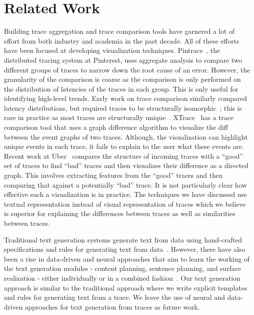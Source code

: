 \section{Related Work}
\label{sec:related}

Building trace aggregation and trace comparison tools have garnered a lot of effort from both industry and academia in the past decade.
All of these efforts have been focused at developing visualization techniques.
Pintrace~\cite{pintrace}, the distributed tracing system at Pinterest, uses aggregate analysis to compare two different groups of traces to 
narrow down the root cause of an error. However, the granularity of the comparison is coarse as the comparison
is only performed on the distribution of latencies of the traces in each group.
This is only useful for identifying high-level trends. Early work on trace comparison similarly compared latency distributions,
but required traces to be structurally isomorphic~\cite{sambasivan2011diagnosing, sambasivan2013visualizing}; this is rare in practice as
most traces are structurally unique~\cite{las2019sifter}. XTrace~\cite{fonseca2007xtrace} has a trace comparison tool
that uses a graph difference algorithm to visualize the diff between the event graphs of two traces. Although, the visualization
can highlight unique events in each trace, it fails to explain to the user what these events are.
Recent work at Uber~\cite{shkurographdiffviz} compares the structure of incoming 
traces with a ``good'' set of traces to find ``bad'' traces and then visualizes their difference as a directed graph. This involves 
extracting features from the ``good'' traces and then comparing that against a potentially ``bad'' trace. It is not particularly
clear how effective such a visualization is in practice. The techniques we have discussed use textual representation instead of visual
representation of traces which we believe is superior for explaining the differences between traces as well as similarities between traces.

Traditional text generation systems generate text from data using hand-crafted specifications and rules for generating
text from data~\cite{dale2003coral,reiter2005choosing,portet2009automatic,turner2009generating}. However,
there have also been a rise in data-driven and neural approaches that aim to learn the working of the text generation
modules - content planning, sentence planning, and surface realization - either individually or in a combined fashion~\cite{barzilay2005collective,barzilay2006aggregation,konstas2013global,lebret2016neural}.
Our text generation approach is similar to the traditional approach where we write explicit templates and rules
for generating text from a trace. We leave the use of neural and data-driven approaches for text generation from
traces as future work.

